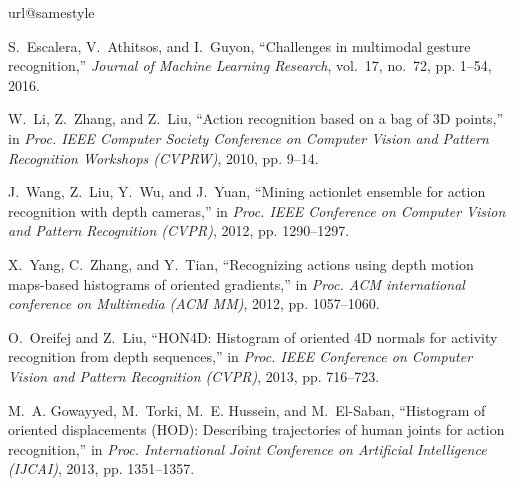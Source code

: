 \documentclass[10pt, a4paper, conference]{IEEEtran}
\begin{document}
\begin{thebibliography}{10}
\providecommand{\url}[1]{#1}
\csname url@samestyle\endcsname
\providecommand{\newblock}{\relax}
\providecommand{\bibinfo}[2]{#2}
\providecommand{\BIBentrySTDinterwordspacing}{\spaceskip=0pt\relax}
\providecommand{\BIBentryALTinterwordstretchfactor}{4}
\providecommand{\BIBentryALTinterwordspacing}{\spaceskip=\fontdimen2\font plus
\BIBentryALTinterwordstretchfactor\fontdimen3\font minus
  \fontdimen4\font\relax}
\providecommand{\BIBforeignlanguage}[2]{{%
\expandafter\ifx\csname l@#1\endcsname\relax
\typeout{** WARNING: IEEEtran.bst: No hyphenation pattern has been}%
\typeout{** loaded for the language `#1'. Using the pattern for}%
\typeout{** the default language instead.}%
\else
\language=\csname l@#1\endcsname
\fi
#2}}
\providecommand{\BIBdecl}{\relax}
\BIBdecl

S.~Escalera, V.~Athitsos, and I.~Guyon, ``Challenges in multimodal gesture
  recognition,'' \emph{Journal of Machine Learning Research}, vol.~17, no.~72,
  pp. 1--54, 2016.

W.~Li, Z.~Zhang, and Z.~Liu, ``Action recognition based on a bag of {3D}
  points,'' in \emph{Proc. IEEE Computer Society Conference on Computer Vision
  and Pattern Recognition Workshops (CVPRW)}, 2010, pp. 9--14.

J.~Wang, Z.~Liu, Y.~Wu, and J.~Yuan, ``Mining actionlet ensemble for action
  recognition with depth cameras,'' in \emph{Proc. IEEE Conference on Computer
  Vision and Pattern Recognition (CVPR)}, 2012, pp. 1290--1297.

X.~Yang, C.~Zhang, and Y.~Tian, ``Recognizing actions using depth motion
  maps-based histograms of oriented gradients,'' in \emph{Proc. ACM
  international conference on Multimedia (ACM MM)}, 2012, pp. 1057--1060.

O.~Oreifej and Z.~Liu, ``{HON4D}: Histogram of oriented {4D} normals for
  activity recognition from depth sequences,'' in \emph{Proc. IEEE Conference
  on Computer Vision and Pattern Recognition (CVPR)}, 2013, pp. 716--723.

M.~A. Gowayyed, M.~Torki, M.~E. Hussein, and M.~El-Saban, ``Histogram of
  oriented displacements ({HOD}): Describing trajectories of human joints for
  action recognition,'' in \emph{Proc. International Joint Conference on
  Artificial Intelligence (IJCAI)}, 2013, pp. 1351--1357.


\end{thebibliography}
\end{document}
